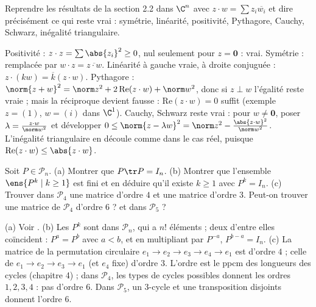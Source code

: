 \begin{exo}
Reprendre les résultats de la section 2.2 dans $\C^n$ avec $z\cdot w=\sum z_i\overline{w_i}$ et dire précisément ce qui reste vrai : symétrie, linéarité, positivité, Pythagore, Cauchy, Schwarz, inégalité triangulaire.
\begin{corrige}
Positivité : $z\cdot z=\sum\abs{z_i}^2\ge0$, nul seulement pour $z=\mathbf 0$ : vrai. Symétrie : remplacée par $w\cdot z=\overline{z\cdot w}$. Linéarité à gauche vraie, à droite \og conjuguée \fg : $z\cdot(kw)=\overline k(z\cdot w)$. Pythagore : $\norm{z+w}^2=\norm z^2+2\,\mathrm{Re}(z\cdot w)+\norm w^2$, donc si $z\perp w$ l'égalité reste vraie ; mais la réciproque devient fausse : $\mathrm{Re}(z\cdot w)=0$ suffit (exemple $z=(1)$, $w=(i)$ dans $\C^1$). Cauchy, Schwarz reste vrai : pour $w\neq\mathbf 0$, poser $\lambda=\frac{z\cdot w}{\norm w^2}$ et développer $0\le\norm{z-\lambda w}^2=\norm z^2-\frac{\abs{z\cdot w}^2}{\norm w^2}$. L'inégalité triangulaire en découle comme dans le cas réel, puisque $\mathrm{Re}(z\cdot w)\le\abs{z\cdot w}$.
\end{corrige}
\end{exo}
\begin{exo}
Soit $P\in\mathcal P_n$. (a) Montrer que $P\tr P=I_n$. (b) Montrer que l'ensemble $\ens{P^k\mid k\ge1}$ est fini et en déduire qu'il existe $k\ge1$ avec $P^k=I_n$. (c) Trouver dans $\mathcal P_4$ une matrice d'ordre $4$ et une matrice d'ordre $3$. Peut-on trouver une matrice de $\mathcal P_4$ d'ordre $6$ ? et dans $\mathcal P_5$ ?
\begin{corrige}
(a) Voir . (b) Les $P^k$ sont dans $\mathcal P_n$, qui a $n!$ éléments ; deux d'entre elles coïncident : $P^a=P^b$ avec $a<b$, et en multipliant par $P^{-a}$, $P^{b-a}=I_n$. (c) La matrice de la permutation circulaire $e_1\to e_2\to e_3\to e_4\to e_1$ est d'ordre $4$ ; celle de $e_1\to e_2\to e_3\to e_1$ (et $e_4$ fixe) d'ordre $3$. L'ordre est le ppcm des longueurs des cycles (chapitre 4) ; dans $\mathcal P_4$, les types de cycles possibles donnent les ordres $1,2,3,4$ : pas d'ordre $6$. Dans $\mathcal P_5$, un $3$-cycle et une transposition disjoints donnent l'ordre $6$.
\end{corrige}
\end{exo}

